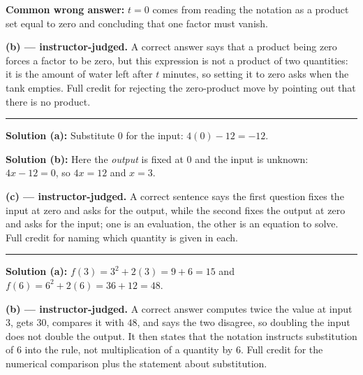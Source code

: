 \documentclass[12pt]{article}
\begin{document}
\textbf{Common wrong answer:} $t = 0$ comes from reading the notation as a product set equal to zero and concluding that one factor must vanish.

\textbf{(b) --- instructor-judged.} A correct answer says that a product being zero forces a factor to be zero, but this expression is not a product of two quantities: it is the amount of water left after $t$ minutes, so setting it to zero asks when the tank empties. Full credit for rejecting the zero-product move by pointing out that there is no product.

\vspace{0.2cm}\noindent\rule{\linewidth}{0.2pt}


\textbf{Solution (a):} Substitute $0$ for the input: $4(0) - 12 = -12$. 

\textbf{Solution (b):} Here the \emph{output} is fixed at $0$ and the input is unknown: $4x - 12 = 0$, so $4x = 12$ and $x = 3$. 

\textbf{(c) --- instructor-judged.} A correct sentence says the first question fixes the input at zero and asks for the output, while the second fixes the output at zero and asks for the input; one is an evaluation, the other is an equation to solve. Full credit for naming which quantity is given in each.

\vspace{0.2cm}\noindent\rule{\linewidth}{0.2pt}


\textbf{Solution (a):} $f(3) = 3^2 + 2(3) = 9 + 6 = 15$ and $f(6) = 6^2 + 2(6) = 36 + 12 = 48$. 

\textbf{(b) --- instructor-judged.} A correct answer computes twice the value at input $3$, gets $30$, compares it with $48$, and says the two disagree, so doubling the input does not double the output. It then states that the notation instructs substitution of $6$ into the rule, not multiplication of a quantity by $6$. Full credit for the numerical comparison plus the statement about substitution.
\end{document}
